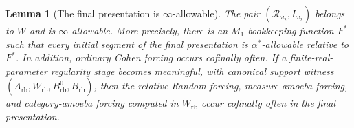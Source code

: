 \documentclass[a4paper,11pt]{article}
\newtheorem{lemma}[theorem]{Lemma}
\begin{document}
\begin{lemma}[The final presentation is \(\infty\)-allowable]
\label{lem:main-iteration-infty-allowable}
\label{fact:main-iteration-infty-allowable}
The pair \((\mathcal R_{\omega_2},\dot I_{\omega_2})\) belongs to \(W\) and is
\(\infty\)-allowable.  More precisely, there is an \(M_1\)-bookkeeping function
\(F^\ast\) such that every initial segment of the final presentation is
\(\alpha^\ast\)-allowable relative to \(F^\ast\).  In addition, ordinary Cohen
forcing occurs cofinally often.  If a finite-real-parameter regularity stage becomes
meaningful, with canonical support witness
\((A_{\mathrm{rb}},\dot W_{\mathrm{rb}},B^0_{\mathrm{rb}},\dot B_{\mathrm{rb}})\),
then the relative Random forcing, measure-amoeba forcing, and category-amoeba
forcing computed in \(\dot W_{\mathrm{rb}}\) occur cofinally often in the final
presentation.
\end{lemma}
\end{document}
